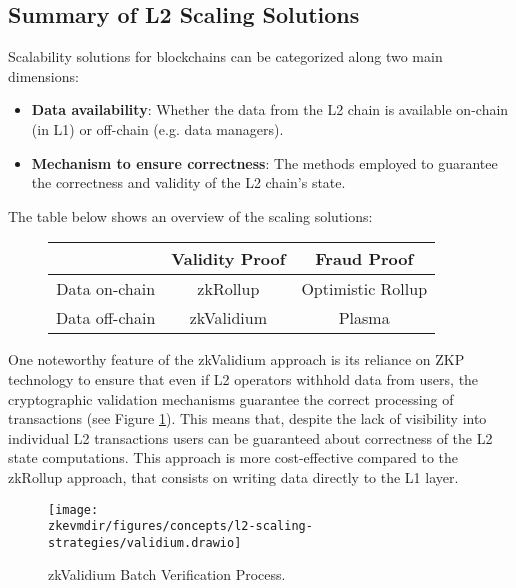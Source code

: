 \subsection{Summary of L2 Scaling Solutions}

Scalability solutions for blockchains can be categorized along two main dimensions:

\begin{itemize}

\item \textbf{Data availability}: Whether the data from the L2 chain is available on-chain (in L1) or off-chain (e.g. data managers).

\item \textbf{Mechanism to ensure correctness}: The methods employed to guarantee the correctness and validity of the L2 chain's state.

\end{itemize}

The table below shows an overview of the scaling solutions:

\begin{figure}[H]
\centering
\begin{tabular}{|c|c|c|}
\hline
\cellcolor{darkgray} & \cellcolor{darkgray} \color{white} Validity Proof  & \cellcolor{darkgray} \color{white} Fraud Proof \\ \hline
\cellcolor{lightgray} Data on-chain   & zkRollup       & Optimistic Rollup \\ \hline
\cellcolor{lightgray} Data off-chain  & zkValidium     & Plasma \\ \hline
\end{tabular}
\end{figure}




One noteworthy feature of the zkValidium approach is its reliance on ZKP technology to ensure that even if L2 operators withhold data from users, the cryptographic validation mechanisms guarantee the correct processing of transactions (see Figure \ref{fig:validium-process}). This means that, despite the lack of visibility into individual L2 transactions users can be guaranteed about correctness of the L2 state computations. This approach is more cost-effective compared to the zkRollup approach, that consists on writing data directly to the L1 layer.

\begin{figure}[h!]
\centering
\texttt{[image: \\zkevmdir/figures/concepts/l2-scaling-strategies/validium.drawio]}
\caption{zkValidium Batch Verification Process.}
\label{fig:validium-process}
\end{figure}



